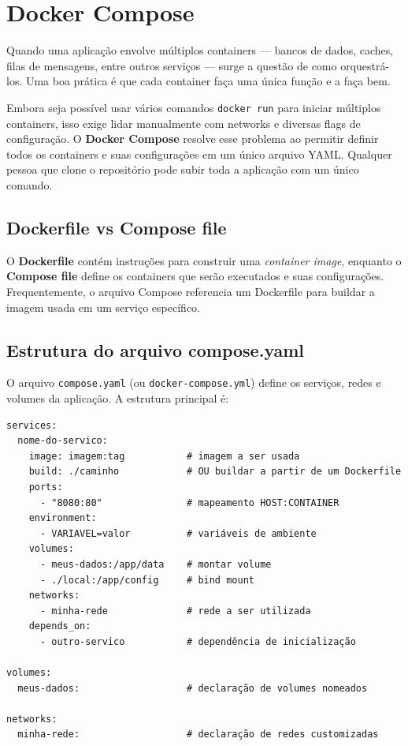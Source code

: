 \section{Docker Compose}

Quando uma aplicação envolve múltiplos containers --- bancos de dados, caches, filas de mensagens, entre outros serviços --- surge a questão de como orquestrá-los. Uma boa prática é que cada container faça uma única função e a faça bem.

Embora seja possível usar vários comandos \texttt{docker run} para iniciar múltiplos containers, isso exige lidar manualmente com networks e diversas flags de configuração. O \textbf{Docker Compose} resolve esse problema ao permitir definir todos os containers e suas configurações em um único arquivo YAML. Qualquer pessoa que clone o repositório pode subir toda a aplicação com um único comando.

\subsection{Dockerfile vs Compose file}

O \textbf{Dockerfile} contém instruções para construir uma \textit{container image}, enquanto o \textbf{Compose file} define os containers que serão executados e suas configurações. Frequentemente, o arquivo Compose referencia um Dockerfile para buildar a imagem usada em um serviço específico.

\subsection{Estrutura do arquivo compose.yaml}

O arquivo \texttt{compose.yaml} (ou \texttt{docker-compose.yml}) define os serviços, redes e volumes da aplicação. A estrutura principal é:

\begin{verbatim}
services:
  nome-do-servico:
    image: imagem:tag           # imagem a ser usada
    build: ./caminho            # OU buildar a partir de um Dockerfile
    ports:
      - "8080:80"               # mapeamento HOST:CONTAINER
    environment:
      - VARIAVEL=valor          # variáveis de ambiente
    volumes:
      - meus-dados:/app/data    # montar volume
      - ./local:/app/config     # bind mount
    networks:
      - minha-rede              # rede a ser utilizada
    depends_on:
      - outro-servico           # dependência de inicialização

volumes:
  meus-dados:                   # declaração de volumes nomeados

networks:
  minha-rede:                   # declaração de redes customizadas
\end{verbatim}

